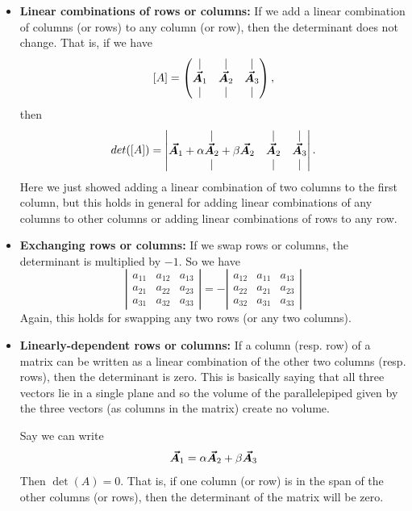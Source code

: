 \begin{itemize}
            \item \textbf{Linear combinations of rows or columns:} If  we add a linear combination of columns (or rows) to any column (or row), then the determinant does not change. That is, if we have
            \[
            [A] = \begin{pmatrix} \vert & \vert & \vert \\ \boldsymbol{\vec{A}}_1 & \boldsymbol{\vec{A}}_2 & \boldsymbol{\vec{A}}_3 \\ \vert & \vert & \vert \end{pmatrix},
            \]
            then
            \[
            det([A]) = \left| \begin{matrix} \vert & \vert & \vert \\ \boldsymbol{\vec{A}}_1+\alpha\boldsymbol{\vec{A}}_2+\beta\boldsymbol{\vec{A}}_2 & \boldsymbol{\vec{A}}_2 & \boldsymbol{\vec{A}}_3 \\ \vert & \vert & \vert \end{matrix}\right|.
            \]
            Here we just showed adding a linear combination of two columns to the first column, but this holds in general for adding linear combinations of any columns to other columns or adding linear combinations of rows to any row.
            \item \textbf{Exchanging rows or columns:} If we swap rows or columns, the determinant is multiplied by $-1$. So we have
            \[
            \left|\begin{array}{ccc}
                a_{11} & a_{12} & a_{13} \\
                a_{21} & a_{22} & a_{23} \\
                a_{31} & a_{32} & a_{33}
            \end{array}\right|=-
            \left|\begin{array}{ccc}
                a_{12} & a_{11} & a_{13} \\
                a_{22} & a_{21} & a_{23} \\
                a_{32} & a_{31} & a_{33}
            \end{array}\right|
            \]
            Again, this holds for swapping any two rows (or any two columns).
            
            \item \textbf{Linearly-dependent rows or columns:} If a column (resp. row) of a matrix can be written as a linear combination of the other two columns (resp. rows), then the determinant is zero.  This is basically saying that all three vectors lie in a single plane and so the volume of the parallelepiped given by the three vectors (as columns in the matrix) create no volume.
            
            Say we can write
            \[
            \boldsymbol{\vec{A}}_1 = \alpha \boldsymbol{\vec{A}}_2 + \beta \boldsymbol{\vec{A}}_3
            \]
            Then $\det(A)=0.$ That is, if one column (or row) is in the span of the other columns (or rows), then the determinant of the matrix will be zero.
        \end{itemize}
        
